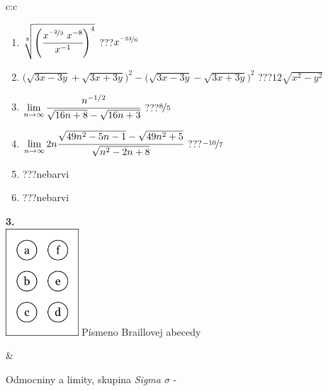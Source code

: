 \documentclass[10pt]{report}
\begin{document}
\begin{tabular}{c:c}
\begin{minipage}[c][104.5mm][t]{0.5\linewidth}
\begin{center}
\begin{minipage}{0.79\linewidth}
\begin{center}
\begin{varwidth}{\linewidth}
\begin{enumerate}
\small
\item $\sqrt[8]{\left(\cfrac{x^{\nicefrac{-2}{3}}\;x^{-8}}{x^{-1}}\right)^{4}}$\quad \dotfill\; ???\;\dotfill \quad $x^{\nicefrac{-23}{6}}$
\item {\footnotesize{\scriptsize$\big(\sqrt{3x-3y}+\sqrt{3x+3y}\big)^2-\big(\sqrt{3x-3y}-\sqrt{3x+3y}\big)^2$}\quad \dotfill\; ???\;\dotfill \quad $12\sqrt{x^2-y^2}$}
\item $\lim\limits_{n\to\infty}\cfrac{n^{-1/2}}{\sqrt{16n+8}-\sqrt{16n+3}}$\quad \dotfill\; ???\;\dotfill \quad $\nicefrac{8}{5}$
\item $\lim\limits_{n\to\infty}2n\cfrac{\sqrt{49n^2-5n-1}-\sqrt{49n^2+5}}{\sqrt{n^2-2n+8}}$\quad \dotfill\; ???\;\dotfill \quad $\nicefrac{-10}{7}$
\item \quad \dotfill\; ???\;\dotfill \quad nebarvi
\item \quad \dotfill\; ???\;\dotfill \quad nebarvi
\end{enumerate}
\end{varwidth}
\end{center}
\end{minipage}
\begin{minipage}{0.20\linewidth}
\begin{center}
{\Huge\bfseries 3.} \\[2mm]
\includegraphics[height=40mm]{../images/braille.png}
{\small Písmeno Braillovej abecedy}
\end{center}
\end{minipage}
\end{center}
\end{minipage}
&
\begin{minipage}[c][104.5mm][t]{0.5\linewidth}
\begin{center}
\vspace{7mm}
{\huge Odmocniny a limity, skupina \textit{Sigma $\sigma$} -}\\[5mm]

\end{center}
\end{minipage}
\end{tabular}
\end{document}
